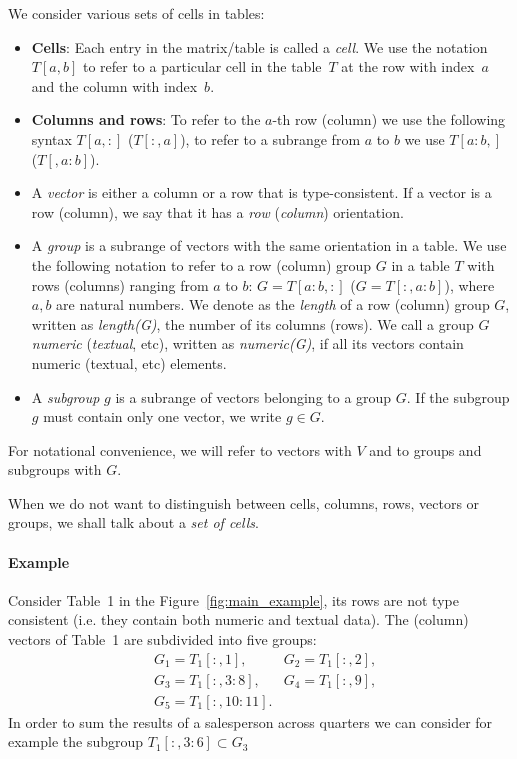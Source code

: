 \documentclass{ecai}
\newcommand{\groups}{\ensuremath{\mathcal{G}}\xspace}
\newcommand{\range}[3]{\ensuremath{#1[#2,#3]}}
\newcommand{\rangeto}[2]{#1{:}#2}
\newcommand{\rangeall}{:}
\begin{document}
We consider various sets of cells in tables:
\begin{itemize}
  \item {\bf Cells}: Each entry in the matrix/table is called  a \textit{cell}.
  We use the notation $T[a,b]$ to refer to a particular cell in the table~$T$ at the row with index~$a$ and the column with index~$b$.
  \item {\bf Columns and rows}: To refer to the $a$-th row (column) we use the following syntax $T[a,{:}]$ ($T[{:},a]$), to refer to a subrange from $a$ to $b$ we use $T[a{:}b,]$ ($T[,a{:}b]$).
  \item
  A \textit{vector} is either a column or a row that is type-consistent.
  If a vector is a row (column), we say that it has a \textit{row} (\textit{column}) orientation.
  \item
  A \textit{group} is a subrange of vectors with the same orientation in a table.
  We use the following notation to refer to a row (column) group $G$ in a table $T$ with rows (columns) ranging from $a$ to $b$: $G = T[a{:}b,:]$ ($G = T[{:},a{:}b]$), where $a,b$ are natural numbers.
  We denote as the \textit{length} of a row (column) group $G$, written as \textit{length(G)}, the number of its columns (rows). We call a group $G$ \textit{numeric} (\textit{textual}, etc), written as \textit{numeric(G)}, if all its vectors contain numeric (textual, etc) elements.
  \item
 A \textit{subgroup} $g$ is a subrange of vectors belonging to a group $G$. If the subgroup $g$ must contain only one vector, we write $g \in G$.
\end{itemize}
For notational convenience, we will refer to vectors with $V$ and to groups and subgroups with $G$.

When we do not want to distinguish between cells, columns, rows, vectors or groups, we shall talk about a {\em set of cells}.

\paragraph{Example}
Consider Table~1 in the Figure~\ref{fig:main_example}, its rows are not type consistent (i.e. they contain both numeric and textual data).
The (column) vectors of Table~1 are subdivided into five groups:
\begin{align*}
&G_1 = \range{T_1}{\rangeall}{1},
&G_2 = \range{T_1}{\rangeall}{2},\\
&G_3 = \range{T_1}{\rangeall}{\rangeto{3}{8}},
&G_4 = \range{T_1}{\rangeall}{9},\\
&G_5 = \range{T_1}{\rangeall}{\rangeto{10}{11}}.
\end{align*}
In order to sum the results of a salesperson across quarters we can consider for example the subgroup $\range{T_1}{\rangeall}{\rangeto{3}{6}} \subset G_3$
\end{document}
